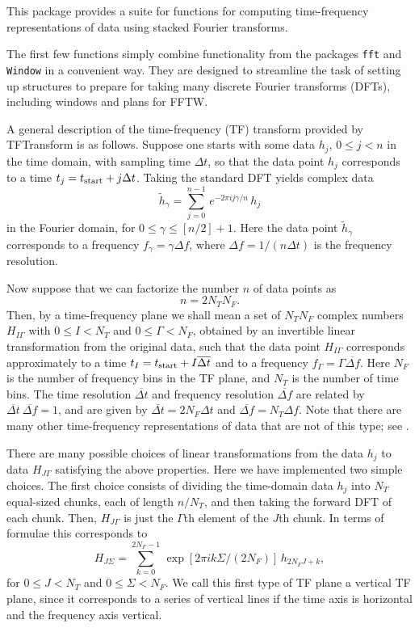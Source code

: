 \noindent This package provides a suite for functions for computing time-frequency
representations of data using stacked Fourier transforms.

The first few functions simply combine functionality from the packages
\verb+fft+ and \verb+Window+ in a convenient way.  They are designed to
streamline the task of setting up structures to prepare for taking many
discrete Fourier transforms (DFTs), including windows and plans for FFTW.

A general description of the time-frequency (TF) transform provided by
TFTransform is as follows.  Suppose one starts with some data $h_j$, $0 \le j
< n$ in the time domain, with sampling time $\Delta t$, so that the data point
$h_j$ corresponds to a time $t_j = t_{\rm start} + j \Delta t$.  Taking the
standard DFT yields complex data
\begin{equation}
{\tilde h}_\gamma = \sum_{j=0}^{n-1} \, e^{-2 \pi i j \gamma / n} \, h_j
\label{standarddft}
\end{equation}
in the Fourier domain, for $0 \le \gamma \le [n/2]+1$.  Here the data point
${\tilde h}_\gamma$ corresponds to a frequency $f_\gamma = \gamma \Delta f$,
where $\Delta f= 1/(n \Delta t)$ is the frequency resolution.  


Now suppose that we can factorize the number $n$ of data points as
\begin{equation}
n = 2 N_T N_F.
\end{equation}
Then, by a time-frequency plane we shall mean a set of $N_T N_F$ complex
numbers $H_{I\Gamma}$ with $0 \le I < N_T$ and $0 \le \Gamma < N_F$, obtained
by an invertible linear transformation from the original data, such  that the
data point $H_{I\Gamma}$ corresponds approximately to a time $t_I = t_{\rm
start} + I {\overline {\Delta t}}$ and to a frequency $f_\Gamma = \Gamma
{\overline {\Delta f}}$.  Here $N_F$ is the number of frequency bins in the TF
plane, and $N_T$ is the number of time bins.  The time resolution ${\overline
{\Delta t}}$ and frequency resolution ${\overline {\Delta f}}$ are related by
${\overline {\Delta t}} \ {\overline {\Delta f}} =1$, and are given by
${\overline {\Delta t}} = 2 N_F \Delta t$ and ${\overline {\Delta f}} = N_T
\Delta f$.  Note that there are many other time-frequency representations
of data that are not of this type; see \cite{ab:1999}.


There are many possible choices of linear transformations from the data $h_j$
to data $H_{J\Gamma}$ satisfying the above properties.  Here we have
implemented two simple choices.  The first choice consists of dividing the
time-domain data $h_j$ into $N_T$ equal-sized chunks, each of length $n/N_T$,
and then taking the forward DFT of each chunk.  Then, $H_{J\Gamma}$ is just
the $\Gamma$th element of the $J$th chunk.  In terms of formulae this
corresponds to
\begin{equation}
H_{J\Sigma} = \sum_{k=0}^{2 N_F-1} \, \exp \left[ 2 \pi i k \Sigma / (2
N_F) \right] \, h_{2 N_F J + k},
\label{verticalTFP}
\end{equation}
for $0 \le J < N_T$ and $0 \le \Sigma < N_F$.  We call this first type
of TF plane a vertical TF plane, since it corresponds to a series of
vertical lines if the time axis is horizontal and the frequency axis
vertical. 

